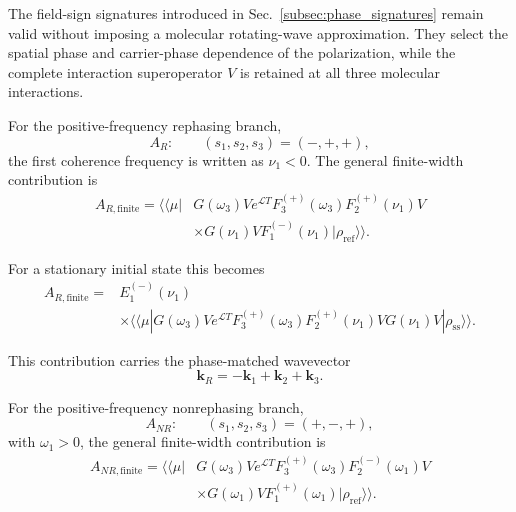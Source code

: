 \documentclass[11pt]{article}
\begin{document}
The field-sign signatures introduced in
Sec.~\ref{subsec:phase_signatures} remain valid without imposing a
molecular rotating-wave approximation. They select the spatial phase
and carrier-phase dependence of the polarization, while the complete
interaction superoperator $V$ is retained at all three molecular
interactions.

For the positive-frequency rephasing branch,
%
\begin{equation}
A_R:
\qquad
(s_1,s_2,s_3)
=
(-,+,+),
\end{equation}
%
the first coherence frequency is written as $\nu_1<0$. The general
finite-width contribution is
%
\begin{equation}
\boxed{
\begin{aligned}
A_{R,\mathrm{finite}}
=
\langle\!\langle\mu|
&G(\omega_3)
V
e^{\mathcal{L}T}
F_3^{(+)}(\omega_3)
F_2^{(+)}(\nu_1)
V
\\
&\times
G(\nu_1)
V
F_1^{(-)}(\nu_1)
|\rho_{\mathrm{ref}}\rangle\rangle .
\end{aligned}
}
\label{eq:AR_finite_general}
\end{equation}

For a stationary initial state this becomes
%
\begin{equation}
\boxed{
\begin{aligned}
A_{R,\mathrm{finite}}
={}&
E_1^{(-)}(\nu_1)
\\
&\times
\langle\!\langle\mu|
G(\omega_3)
V
e^{\mathcal{L}T}
F_3^{(+)}(\omega_3)
F_2^{(+)}(\nu_1)
V
G(\nu_1)
V
|\rho_{\mathrm{ss}}\rangle\rangle .
\end{aligned}
}
\label{eq:AR_finite}
\end{equation}

This contribution carries the phase-matched wavevector
%
\begin{equation}
\mathbf{k}_R
=
-\mathbf{k}_1+\mathbf{k}_2+\mathbf{k}_3.
\end{equation}

For the positive-frequency nonrephasing branch,
%
\begin{equation}
A_{NR}:
\qquad
(s_1,s_2,s_3)
=
(+,-,+),
\end{equation}
%
with $\omega_1>0$, the general finite-width contribution is
%
\begin{equation}
\boxed{
\begin{aligned}
A_{NR,\mathrm{finite}}
=
\langle\!\langle\mu|
&G(\omega_3)
V
e^{\mathcal{L}T}
F_3^{(+)}(\omega_3)
F_2^{(-)}(\omega_1)
V
\\
&\times
G(\omega_1)
V
F_1^{(+)}(\omega_1)
|\rho_{\mathrm{ref}}\rangle\rangle .
\end{aligned}
}
\label{eq:ANR_finite_general}
\end{equation}
\end{document}
